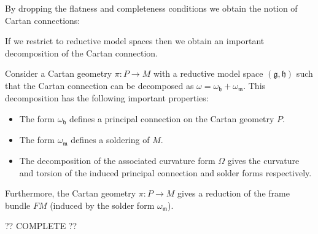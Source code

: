     By dropping the flatness and completeness conditions we obtain the notion of Cartan connections:

    If we restrict to reductive model spaces then we obtain an important decomposition of the Cartan connection.
    \begin{property}
        Consider a Cartan geometry $\pi:P\rightarrow M$ with a reductive model space $(\mathfrak{g}, \mathfrak{h})$ such that the Cartan connection can be decomposed as $\omega=\omega_{\mathfrak{h}}+\omega_{\mathfrak{m}}$. This decomposition has the following important properties:
        \begin{itemize}
            \item The form $\omega_{\mathfrak{h}}$ defines a principal connection on the Cartan geometry $P$.
            \item The form $\omega_{\mathfrak{m}}$ defines a soldering of $M$.
            \item The decomposition of the associated curvature form $\Omega$ gives the curvature and torsion of the induced principal connection and solder forms respectively.
        \end{itemize}
        Furthermore, the Cartan geometry $\pi:P\rightarrow M$ gives a reduction of the frame bundle $FM$ (induced by the solder form $\omega_{\mathfrak{m}}$).
    \end{property}
    ?? COMPLETE ??

